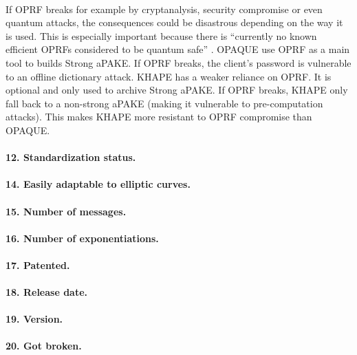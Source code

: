 \documentclass[../report.tex]{subfiles}
\begin{document}
\paragraph{}
If OPRF breaks for example by cryptanalysis, security compromise or even quantum attacks, the consequences could be disastrous depending on the way it is used. This is especially important because there is ``currently no known efficient OPRFs considered to be quantum safe'' \cite{KHAPE_Paper}.
OPAQUE use OPRF as a main tool to builds Strong aPAKE. If OPRF breaks, the client's password is vulnerable to an offline dictionary attack.
KHAPE has a weaker reliance on OPRF. It is optional and only used to archive Strong aPAKE. If OPRF breaks, KHAPE only fall back to a non-strong aPAKE (making it vulnerable to pre-computation attacks). 
This makes KHAPE more resistant to OPRF compromise than OPAQUE. 

\paragraph{12. Standardization status.}

\paragraph{}

\paragraph{14. Easily adaptable to elliptic curves.}


\paragraph{15. Number of messages.}


\paragraph{16. Number of exponentiations.}


\paragraph{17. Patented.}


\paragraph{18. Release date.}


\paragraph{19. Version.}


\paragraph{20. Got broken.}
\end{document}
